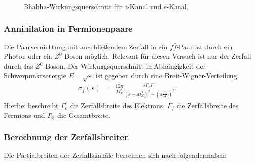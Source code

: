 \begin{figure}
	\centering
	\caption[Bhabha-Wirkungsquerschnitt für t-Kanal und s-Kanal]{Bhabha-Wirkungsquerschnitt für t-Kanal und s-Kanal.}
	\label{fig:winkelbhabhatheorie}
\end{figure}

\subsubsection{Annihilation in Fermionenpaare}
Die Paarvernichtung mit anschließendem Zerfall in ein $f\bar f$-Paar ist durch ein Photon oder ein $Z^0$-Boson möglich. Relevant für diesen Versuch ist nur der Zerfall durch das $Z^0$-Boson. Der Wirkungsquerschnitt in Abhängigkeit der Schwerpunktsenergie $E=\sqrt{s}$ ist gegeben durch eine Breit-Wigner-Verteilung:
\begin{align}
	\sigma_f(s)&=\frac{12\pi}{M_Z^2}\frac{s\Gamma_e\Gamma_f}{\left(s-M_Z^2\right)^2+\left(s\frac{\Gamma_Z}{M_z}\right)^2}\text{.}
\end{align}
Hierbei beschreibt $\Gamma_e$ die Zerfallsbreite des Elektrons, $\Gamma_f$ die Zerfallsbreite des Fermions und $\Gamma_Z$ die Gesamtbreite.

\subsubsection{Berechnung der Zerfallsbreiten}\label{sec:partialbreiten}

Die Partialbreiten der Zerfallskanäle berechnen sich nach \cite{anleitungalt} folgendermaßen:

